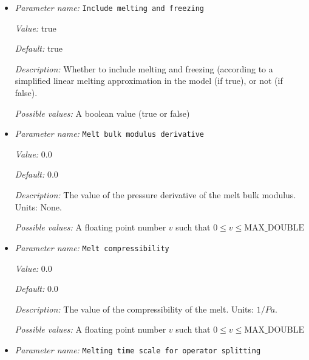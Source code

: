 \begin{itemize}
{\it Default:} 27


{\it Description:} The porosity dependence of the viscosity. Units: dimensionless.


{\it Possible values:} A floating point number $v$ such that $0 \leq v \leq \text{MAX\_DOUBLE}$
\item {\it Parameter name:} {\tt Include melting and freezing}
\label{parameters:Material model/Melt global/Include melting and freezing}


{\it Value:} true


{\it Default:} true


{\it Description:} Whether to include melting and freezing (according to a simplified linear melting approximation in the model (if true), or not (if false).


{\it Possible values:} A boolean value (true or false)
\item {\it Parameter name:} {\tt Melt bulk modulus derivative}
\label{parameters:Material model/Melt global/Melt bulk modulus derivative}


{\it Value:} 0.0


{\it Default:} 0.0


{\it Description:} The value of the pressure derivative of the melt bulk modulus. Units: None.


{\it Possible values:} A floating point number $v$ such that $0 \leq v \leq \text{MAX\_DOUBLE}$
\item {\it Parameter name:} {\tt Melt compressibility}
\label{parameters:Material model/Melt global/Melt compressibility}


{\it Value:} 0.0


{\it Default:} 0.0


{\it Description:} The value of the compressibility of the melt. Units: $1/Pa$.


{\it Possible values:} A floating point number $v$ such that $0 \leq v \leq \text{MAX\_DOUBLE}$
\item {\it Parameter name:} {\tt Melting time scale for operator splitting}
\label{parameters:Material model/Melt global/Melting time scale for operator splitting}



\end{itemize}
